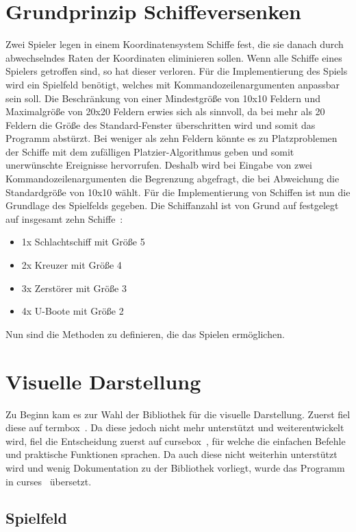 \documentclass{llncs}
\begin{document}
\section{Grundprinzip Schiffeversenken}
Zwei Spieler legen in einem Koordinatensystem Schiffe fest, die sie danach durch abwechselndes Raten der Koordinaten eliminieren sollen.
Wenn alle Schiffe eines Spielers getroffen sind, so hat dieser verloren.
Für die Implementierung des Spiels wird ein Spielfeld benötigt, welches mit Kommandozeilenargumenten anpassbar sein soll. Die Beschränkung von einer Mindestgröße von 10x10 Feldern und Maximalgröße von 20x20
Feldern erwies sich als sinnvoll, da bei mehr als 20 Feldern die Größe des Standard-Fenster überschritten wird und somit das Programm abstürzt.
Bei weniger als zehn Feldern könnte es zu Platzproblemen der Schiffe mit dem zufälligen Platzier-Algorithmus geben und somit unerwünschte Ereignisse hervorrufen.
Deshalb wird bei Eingabe von zwei Kommandozeilenargumenten die Begrenzung abgefragt, die bei Abweichung die Standardgröße von 10x10 wählt.
Für die Implementierung von Schiffen ist nun die Grundlage des Spielfelds gegeben.
Die Schiffanzahl ist von Grund auf festgelegt auf insgesamt zehn Schiffe~\cite{Schiffeversenken}:
\begin{itemize}
  \item 1x Schlachtschiff mit Größe 5
  \item 2x Kreuzer mit Größe 4
  \item 3x Zerstörer mit Größe 3
  \item 4x U-Boote mit Größe 2
\end{itemize}

Nun sind die Methoden zu definieren, die das Spielen ermöglichen. 

\section{Visuelle Darstellung}

Zu Beginn kam es zur Wahl der Bibliothek für die visuelle Darstellung. Zuerst fiel diese auf termbox~\cite{Termbox}. Da diese jedoch nicht mehr unterstützt und weiterentwickelt wird, fiel die Entscheidung zuerst auf cursebox~\cite{Cursebox}, für welche
die einfachen Befehle und praktische Funktionen sprachen. Da auch diese nicht weiterhin unterstützt wird und wenig Dokumentation zu der Bibliothek vorliegt, wurde das Programm in curses~\cite{Curses} übersetzt.

\subsection{Spielfeld}
\end{document}
